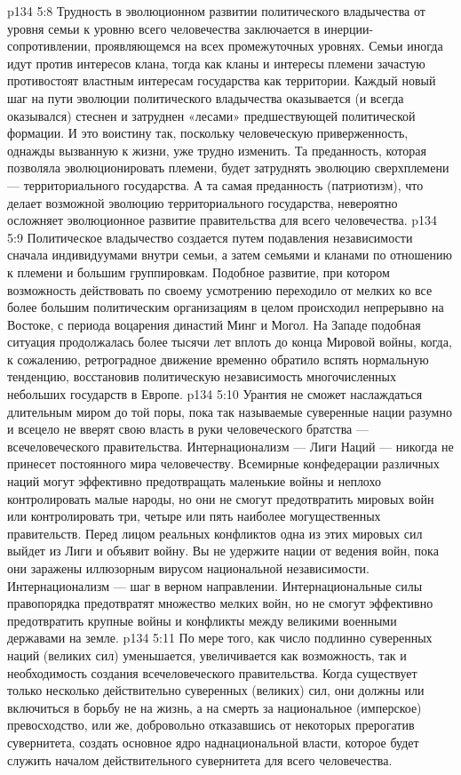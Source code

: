 \vs p134 5:8 Трудность в эволюционном развитии политического владычества от уровня семьи к уровню всего человечества заключается в инерции\hyp{}сопротивлении, проявляющемся на всех промежуточных уровнях. Семьи иногда идут против интересов клана, тогда как кланы и интересы племени зачастую противостоят властным интересам государства как территории. Каждый новый шаг на пути эволюции политического владычества оказывается (и всегда оказывался) стеснен и затруднен «лесами» предшествующей политической формации. И это воистину так, поскольку человеческую приверженность, однажды вызванную к жизни, уже трудно изменить. Та преданность, которая позволяла эволюционировать племени, будет затруднять эволюцию сверхплемени --- территориального государства. А та самая преданность (патриотизм), что делает возможной эволюцию территориального государства, невероятно осложняет эволюционное развитие правительства для всего человечества.
\vs p134 5:9 Политическое владычество создается путем подавления независимости сначала индивидуумами внутри семьи, а затем семьями и кланами по отношению к племени и большим группировкам. Подобное развитие, при котором возможность действовать по своему усмотрению переходило от мелких ко все более большим политическим организациям в целом происходил непрерывно на Востоке, с периода воцарения династий Минг и Могол. На Западе подобная ситуация продолжалась более тысячи лет вплоть до конца Мировой войны, когда, к сожалению, ретроградное движение временно обратило вспять нормальную тенденцию, восстановив политическую независимость многочисленных небольших государств в Европе.
\vs p134 5:10 Урантия не сможет наслаждаться длительным миром до той поры, пока так называемые суверенные нации разумно и всецело не вверят свою власть в руки человеческого братства --- всечеловеческого правительства. Интернационализм --- Лиги Наций --- никогда не принесет постоянного мира человечеству. Всемирные конфедерации различных наций могут эффективно предотвращать маленькие войны и неплохо контролировать малые народы, но они не смогут предотвратить мировых войн или контролировать три, четыре или пять наиболее могущественных правительств. Перед лицом реальных конфликтов одна из этих мировых сил выйдет из Лиги и объявит войну. Вы не удержите нации от ведения войн, пока они заражены иллюзорным вирусом национальной независимости. Интернационализм --- шаг в верном направлении. Интернациональные силы правопорядка предотвратят множество мелких войн, но не смогут эффективно предотвратить крупные войны и конфликты между великими военными державами на земле.
\vs p134 5:11 По мере того, как число подлинно суверенных наций (великих сил) уменьшается, увеличивается как возможность, так и необходимость создания всечеловеческого правительства. Когда существует только несколько действительно суверенных (великих) сил, они должны или включиться в борьбу не на жизнь, а на смерть за национальное (имперское) превосходство, или же, добровольно отказавшись от некоторых прерогатив сувернитета, создать основное ядро наднациональной власти, которое будет служить началом действительного сувернитета для всего человечества.
